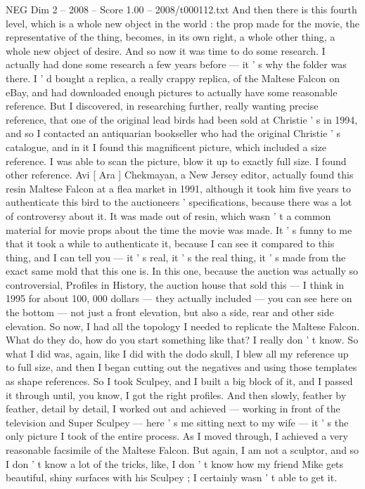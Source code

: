 \begin{textsample}{NEG Dim 2 – 2008 – Score 1.00 – 2008/t000112.txt}
And then there is this fourth level, which is a whole new object in the world : the prop made for the movie, the representative of the thing, becomes, in its own right, a whole other thing, a whole new object of desire.
And so now it was time to do some research.
I actually had done some research a few years before — it ' s why the folder was there.
I ' d bought a replica, a really crappy replica, of the Maltese Falcon on eBay, and had downloaded enough pictures to actually have some reasonable reference.
But I discovered, in researching further, really wanting precise reference, that one of the original lead birds had been sold at Christie ' s in 1994, and so I contacted an antiquarian bookseller who had the original Christie ' s catalogue, and in it I found this magnificent picture, which included a size reference.
I was able to scan the picture, blow it up to exactly full size.
I found other reference.
Avi [ Ara ] Chekmayan, a New Jersey editor, actually found this resin Maltese Falcon at a flea market in 1991, although it took him five years to authenticate this bird to the auctioneers ' specifications, because there was a lot of controversy about it.
It was made out of resin, which wasn ' t a common material for movie props about the time the movie was made.
It ' s funny to me that it took a while to authenticate it, because I can see it compared to this thing, and I can tell you — it ' s real, it ' s the real thing, it ' s made from the exact same mold that this one is.
In this one, because the auction was actually so controversial, Profiles in History, the auction house that sold this — I think in 1995 for about 100, 000 dollars — they actually included — you can see here on the bottom — not just a front elevation, but also a side, rear and other side elevation.
So now, I had all the topology I needed to replicate the Maltese Falcon.
What do they do, how do you start something like that?
I really don ' t know.
So what I did was, again, like I did with the dodo skull, I blew all my reference up to full size, and then I began cutting out the negatives and using those templates as shape references.
So I took Sculpey, and I built a big block of it, and I passed it through until, you know, I got the right profiles.
And then slowly, feather by feather, detail by detail, I worked out and achieved — working in front of the television and Super Sculpey — here ' s me sitting next to my wife — it ' s the only picture I took of the entire process.
As I moved through, I achieved a very reasonable facsimile of the Maltese Falcon.
But again, I am not a sculptor, and so I don ' t know a lot of the tricks, like, I don ' t know how my friend Mike gets beautiful, shiny surfaces with his Sculpey ; I certainly wasn ' t able to get it.

\end{textsample}

